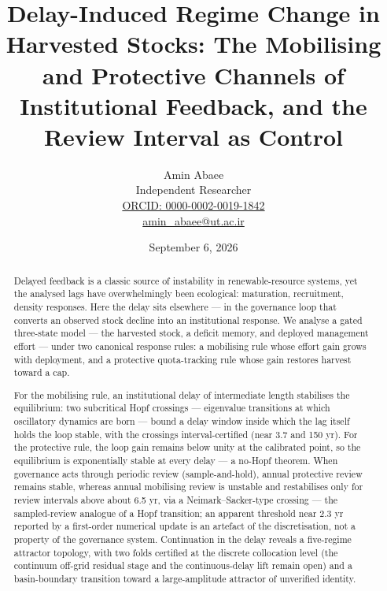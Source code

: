 \documentclass[11pt]{article}
\begin{document}
\title{Delay-Induced Regime Change in Harvested Stocks: The Mobilising and Protective Channels of Institutional Feedback, and the Review Interval as Control}
\author{Amin Abaee\\[0.35em]
{\small Independent Researcher}\\[0.55em]
{\small\href{https://orcid.org/0000-0002-0019-1842}{ORCID: 0000-0002-0019-1842}}\\[0.3em]
{\small\href{mailto:amin\_abaee@ut.ac.ir}{amin\_abaee@ut.ac.ir}}}
\date{September 6, 2026}
\maketitle

\begin{abstract}


Delayed feedback is a classic source of instability in
renewable-resource systems, yet the analysed lags have overwhelmingly
been ecological: maturation, recruitment, density responses. Here the
delay sits elsewhere --- in the governance loop that converts an
observed stock decline into an institutional response. We analyse a
gated three-state model --- the harvested stock, a deficit memory, and
deployed management effort --- under two canonical response rules: a
mobilising rule whose effort gain grows with deployment, and a
protective quota-tracking rule whose gain restores harvest toward a cap.

For the mobilising rule, an institutional delay of intermediate length
stabilises the equilibrium: two subcritical Hopf crossings ---
eigenvalue transitions at which oscillatory dynamics are born --- bound
a delay window inside which the lag itself holds the loop stable, with
the crossings interval-certified (near 3.7 and 150 yr). For the
protective rule, the loop gain remains below unity at the calibrated
point, so the equilibrium is exponentially stable at every delay --- a
no-Hopf theorem. When governance acts through periodic review
(sample-and-hold), annual protective review remains stable, whereas
annual mobilising review is unstable and restabilises only for review
intervals above about 6.5 yr, via a Neimark--Sacker-type crossing ---
the sampled-review analogue of a Hopf transition; an apparent threshold
near 2.3 yr reported by a first-order numerical update is an artefact of
the discretisation, not a property of the governance system.
Continuation in the delay reveals a five-regime attractor topology, with
two folds certified at the discrete collocation level (the continuum
off-grid residual stage and the continuous-delay lift remain open) and a
basin-boundary transition toward a large-amplitude attractor of
unverified identity.


\end{abstract}
\end{document}
